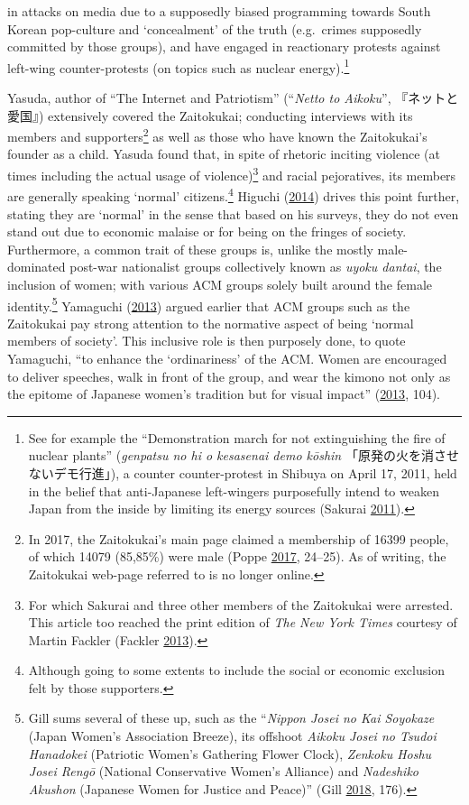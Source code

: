 \documentclass[10pt,british,A4paper,twoside]{memoir}
\begin{document}
in attacks on media due to a supposedly biased programming towards South
Korean pop-culture and `concealment' of the truth (e.g.~crimes
supposedly committed by those groups), and have engaged in reactionary
protests against left-wing counter-protests (on topics such as nuclear
energy).\footnote{See for example the ``Demonstration march for not
  extinguishing the fire of nuclear plants'' (\emph{genpatsu no hi o
  kesasenai demo kōshin} 「原発の火を消させないデモ行進」), a counter
  counter-protest in Shibuya on April 17, 2011, held in the belief that
  anti-Japanese left-wingers purposefully intend to weaken Japan from
  the inside by limiting its energy sources (Sakurai
  \protect\hyperlink{ref-sakurai__2011}{2011}).}

Yasuda, author of ``The Internet and Patriotism'' (``\emph{Netto to
Aikoku}'', 『ネットと愛国』) extensively covered the Zaitokukai;
conducting interviews with its members and supporters\footnote{In 2017,
  the Zaitokukai's main page claimed a membership of 16399 people, of
  which 14079 (85,85\%) were male (Poppe
  \protect\hyperlink{ref-poppe_digitaal_2017}{2017}, 24--25). As of
  writing, the Zaitokukai web-page referred to is no longer online.} as
well as those who have known the Zaitokukai's founder as a child. Yasuda
found that, in spite of rhetoric inciting violence (at times including
the actual usage of violence)\footnote{For which Sakurai and three other
  members of the Zaitokukai were arrested. This article too reached the
  print edition of \emph{The New York Times} courtesy of Martin Fackler
  (Fackler \protect\hyperlink{ref-fackler_japanese_2013}{2013}).} and
racial pejoratives, its members are generally speaking `normal'
citizens.\footnote{Although going to some extents to include the social
  or economic exclusion felt by those supporters.} Higuchi
(\protect\hyperlink{ref-higuchi_japans_2014}{2014}) drives this point
further, stating they are `normal' in the sense that based on his
surveys, they do not even stand out due to economic malaise or for being
on the fringes of society. Furthermore, a common trait of these groups
is, unlike the mostly male-dominated post-war nationalist groups
collectively known as \emph{uyoku dantai}, the inclusion of women; with
various ACM groups solely built around the female identity.\footnote{Gill
  sums several of these up, such as the ``\emph{Nippon Josei no Kai
  Soyokaze} (Japan Women's Association Breeze), its offshoot
  \emph{Aikoku Josei no Tsudoi Hanadokei} (Patriotic Women's Gathering
  Flower Clock), \emph{Zenkoku Hoshu Josei Rengō} (National Conservative
  Women's Alliance) and \emph{Nadeshiko Akushon} (Japanese Women for
  Justice and Peace)'' (Gill
  \protect\hyperlink{ref-gill_nativist_2018}{2018}, 176).} Yamaguchi
(\protect\hyperlink{ref-yamaguchi_xenophobia_2013}{2013}) argued earlier
that ACM groups such as the Zaitokukai pay strong attention to the
normative aspect of being `normal members of society'. This inclusive
role is then purposely done, to quote Yamaguchi, ``to enhance the
`ordinariness' of the ACM. Women are encouraged to deliver speeches,
walk in front of the group, and wear the kimono not only as the epitome
of Japanese women's tradition but for visual impact''
(\protect\hyperlink{ref-yamaguchi_xenophobia_2013}{2013}, 104).
\end{document}
